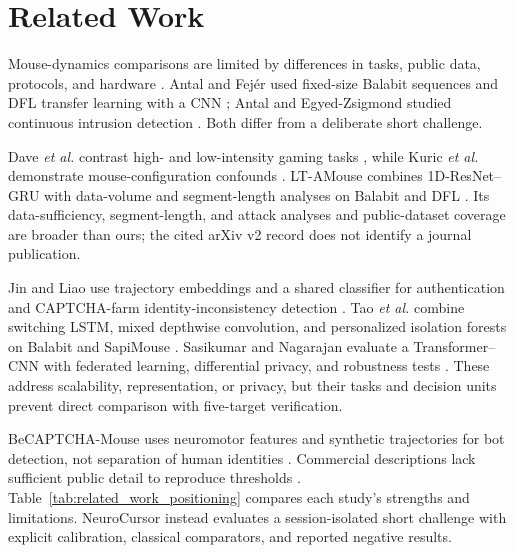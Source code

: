 \documentclass[conference]{IEEEtran}
\begin{document}
\section{Related Work}

Mouse-dynamics comparisons are limited by differences in tasks, public data,
protocols, and hardware \cite{khanMouseSurvey}. Antal and Fej\'er used
fixed-size Balabit sequences and DFL transfer learning with a CNN
\cite{antalFejer2020}; Antal and Egyed-Zsigmond studied continuous intrusion
detection \cite{antalEgyed2019}. Both differ from a deliberate short challenge.

Dave \textit{et al.} contrast high- and low-intensity gaming tasks
\cite{dave2024Clicks}, while Kuric \textit{et al.} demonstrate mouse-configuration
confounds \cite{kuricMouseCredibility}. LT-AMouse combines 1D-ResNet--GRU with
data-volume and segment-length analyses on Balabit and DFL
\cite{wang2025Mouse}. Its data-sufficiency, segment-length, and attack analyses
and public-dataset coverage are broader than ours; the cited arXiv v2 record
does not identify a journal publication.

Jin and Liao use trajectory embeddings and a shared classifier for
authentication and CAPTCHA-farm identity-inconsistency detection
\cite{jin2025Similarity}. Tao \textit{et al.} combine switching LSTM, mixed
depthwise convolution, and personalized isolation forests on Balabit and
SapiMouse \cite{tao2026Spatiotemporal}. Sasikumar and Nagarajan evaluate a
Transformer--CNN with federated learning, differential privacy, and robustness
tests \cite{sasikumar2026Privacy}. These address scalability, representation,
or privacy, but their tasks and decision units prevent direct comparison
with five-target verification.

BeCAPTCHA-Mouse uses neuromotor features and synthetic trajectories for bot
detection, not separation of human identities \cite{acien2022BeCAPTCHA}.
Commercial descriptions lack sufficient public detail to reproduce thresholds
\cite{graboxyContinuous,graboxyMFA,googleRecaptchaV3}.
Table~\ref{tab:related_work_positioning} compares each study's strengths and
limitations. NeuroCursor instead evaluates a session-isolated short challenge
with explicit calibration, classical comparators, and reported negative results.
\end{document}
